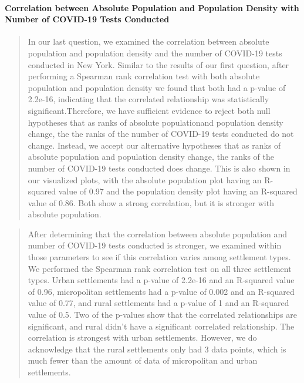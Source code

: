 \documentclass[
  12pt,
]{article}
\begin{document}
\hypertarget{correlation-between-absolute-population-and-population-density-with-number-of-covid-19-tests-conducted}{%
\paragraph{Correlation between Absolute Population and Population
Density with Number of COVID-19 Tests
Conducted}\label{correlation-between-absolute-population-and-population-density-with-number-of-covid-19-tests-conducted}}

\begin{quote}
In our last question, we examined the correlation between absolute
population and population density and the number of COVID-19 tests
conducted in New York. Similar to the results of our first question,
after performing a Spearman rank correlation test with both absolute
population and population density we found that both had a p-value of
2.2e-16, indicating that the correlated relationship was statistically
significant.Therefore, we have sufficient evidence to reject both null
hypotheses that as ranks of absolute populationand population density
change, the the ranks of the number of COVID-19 tests conducted do not
change. Instead, we accept our alternative hypotheses that as ranks of
absolute population and population density change, the ranks of the
number of COVID-19 tests conducted does change. This is also shown in
our visualized plots, with the absolute population plot having an
R-squared value of 0.97 and the population density plot having an
R-squared value of 0.86. Both show a strong correlation, but it is
stronger with absolute population.
\end{quote}

\begin{quote}
After determining that the correlation between absolute population and
number of COVID-19 tests conducted is stronger, we examined within those
parameters to see if this correlation varies among settlement types. We
performed the Spearman rank correlation test on all three settlement
types. Urban settlements had a p-value of 2.2e-16 and an R-squared value
of 0.96, micropolitan settlements had a p-value of 0.002 and an
R-squared value of 0.77, and rural settlements had a p-value of 1 and an
R-squared value of 0.5. Two of the p-values show that the correlated
relationships are significant, and rural didn't have a significant
correlated relationship. The correlation is strongest with urban
settlements. However, we do acknowledge that the rural settlements only
had 3 data points, which is much fewer than the amount of data of
micropolitan and urban settlements.
\end{quote}
\end{document}
